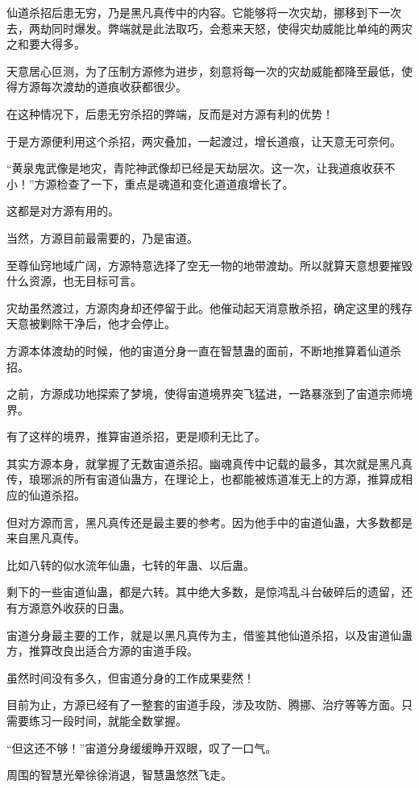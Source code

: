 \begin{this_body}
仙道杀招后患无穷，乃是黑凡真传中的内容。它能够将一次灾劫，挪移到下一次去，两劫同时爆发。弊端就是此法取巧，会惹来天怒，使得灾劫威能比单纯的两灾之和要大得多。

天意居心叵测，为了压制方源修为进步，刻意将每一次的灾劫威能都降至最低，使得方源每次渡劫的道痕收获都很少。

在这种情况下，后患无穷杀招的弊端，反而是对方源有利的优势！

于是方源便利用这个杀招，两灾叠加，一起渡过，增长道痕，让天意无可奈何。

“黄泉鬼武像是地灾，青陀神武像却已经是天劫层次。这一次，让我道痕收获不小！”方源检查了一下，重点是魂道和变化道道痕增长了。

这都是对方源有用的。

当然，方源目前最需要的，乃是宙道。

至尊仙窍地域广阔，方源特意选择了空无一物的地带渡劫。所以就算天意想要摧毁什么资源，也无目标可言。

灾劫虽然渡过，方源肉身却还停留于此。他催动起天消意散杀招，确定这里的残存天意被剿除干净后，他才会停止。

方源本体渡劫的时候，他的宙道分身一直在智慧蛊的面前，不断地推算着仙道杀招。

之前，方源成功地探索了梦境，使得宙道境界突飞猛进，一路暴涨到了宙道宗师境界。

有了这样的境界，推算宙道杀招，更是顺利无比了。

其实方源本身，就掌握了无数宙道杀招。幽魂真传中记载的最多，其次就是黑凡真传，琅琊派的所有宙道仙蛊方，在理论上，也都能被炼道准无上的方源，推算成相应的仙道杀招。

但对方源而言，黑凡真传还是最主要的参考。因为他手中的宙道仙蛊，大多数都是来自黑凡真传。

比如八转的似水流年仙蛊，七转的年蛊、以后蛊。

剩下的一些宙道仙蛊，都是六转。其中绝大多数，是惊鸿乱斗台破碎后的遗留，还有方源意外收获的日蛊。

宙道分身最主要的工作，就是以黑凡真传为主，借鉴其他仙道杀招，以及宙道仙蛊方，推算改良出适合方源的宙道手段。

虽然时间没有多久，但宙道分身的工作成果斐然！

目前为止，方源已经有了一整套的宙道手段，涉及攻防、腾挪、治疗等等方面。只需要练习一段时间，就能全数掌握。

“但这还不够！”宙道分身缓缓睁开双眼，叹了一口气。

周围的智慧光晕徐徐消退，智慧蛊悠然飞走。


\end{this_body}
